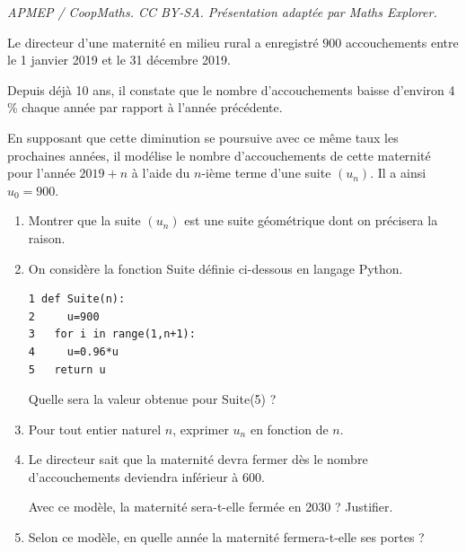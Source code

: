 \documentclass[10pt]{article}
\begin{document}
\noindent\textit{APMEP / CoopMaths. CC BY-SA. Présentation adaptée par Maths Explorer.}\par\medskip
\medskip

Le directeur d'une maternité en milieu rural a enregistré $900$ accouchements entre le 1
janvier 2019 et le 31 décembre 2019.

Depuis déjà 10 ans, il constate que le nombre d'accouchements baisse d'environ 4\,\% chaque
année par rapport à l'année précédente.

En supposant que cette diminution se poursuive avec ce même taux les prochaines années, il
modélise le nombre d'accouchements de cette maternité pour l'année $2019 + n$ à l'aide du
$n$-ième terme d'une suite $\left(u_n\right)$. Il a ainsi $u_0 = 900$.

\medskip

\begin{enumerate}
\item Montrer que la suite $\left(u_n\right)$ est une suite géométrique dont on précisera la raison.
\item On considère la fonction Suite définie ci-dessous en langage Python.
\begin{lstlisting}[style=python]
1 def Suite(n):
2 	  u=900
3   for i in range(1,n+1):
4 	  u=0.96*u
5   return u 
\end{lstlisting}

Quelle sera la valeur obtenue pour Suite(5) ?
\item Pour tout entier naturel $n$, exprimer $u_n$ en fonction de $n$.
\item Le directeur sait que la maternité devra fermer dès le nombre d'accouchements
deviendra inférieur à 600.

Avec ce modèle, la maternité sera-t-elle fermée en 2030 ? Justifier.
\item Selon ce modèle, en quelle année la maternité fermera-t-elle ses portes ?
\end{enumerate}

\vspace{0,5cm}
\end{document}
